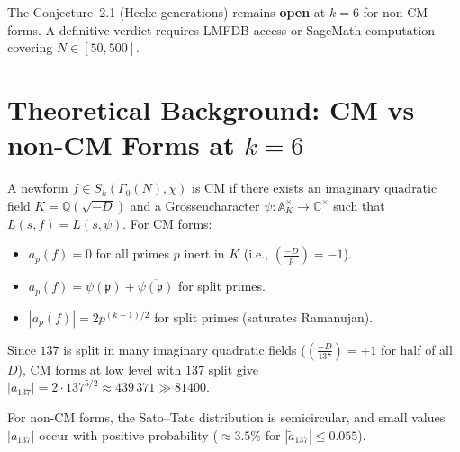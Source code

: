 \documentclass[12pt,a4paper]{article}
\theoremstyle{definition}
\theoremstyle{remark}
\begin{document}
The Conjecture~2.1 (Hecke generations) remains \textbf{open} at $k=6$
for non-CM forms.  A definitive verdict requires LMFDB access or SageMath
computation covering $N \in [50,500]$.

\appendix

\section{Theoretical Background: CM vs non-CM Forms at $k=6$}
\label{app:cm_vs_noncm}

A newform $f \in S_k(\Gamma_0(N), \chi)$ is CM if there exists an imaginary
quadratic field $K = \mathbb{Q}(\sqrt{-D})$ and a Grössencharacter
$\psi: \mathbb{A}_K^\times \to \mathbb{C}^\times$ such that
$L(s, f) = L(s, \psi)$.  For CM forms:
\begin{itemize}
  \item $a_p(f) = 0$ for all primes $p$ inert in $K$ (i.e., $\left(\frac{-D}{p}\right) = -1$).
  \item $a_p(f) = \psi(\mathfrak{p}) + \overline{\psi(\mathfrak{p})}$ for split primes.
  \item $|a_p(f)| = 2p^{(k-1)/2}$ for split primes (saturates Ramanujan).
\end{itemize}
Since $137$ is split in many imaginary quadratic fields ($\left(\frac{-D}{137}\right) = +1$ 
for half of all $D$), CM forms at low level with $137$ split give
$|a_{137}| = 2 \cdot 137^{5/2} \approx 439\,371 \gg 81400$.

For non-CM forms, the Sato--Tate distribution is semicircular, and small
values $|a_{137}|$ occur with positive probability
($\approx 3.5\%$ for $|\tilde{a}_{137}| \le 0.055$).
\end{document}
